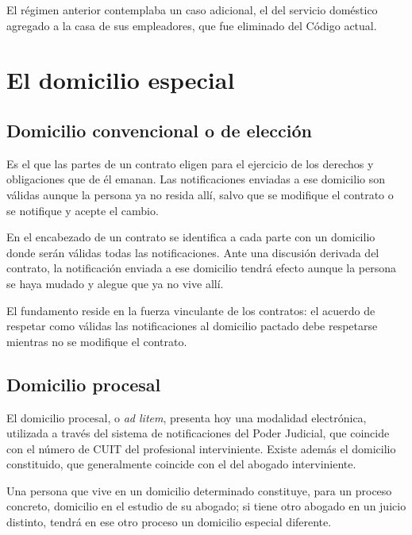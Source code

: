 \documentclass[12pt,oneside]{book}
\begin{document}
El régimen anterior contemplaba un caso adicional, el del servicio doméstico agregado a la casa de sus empleadores, que fue eliminado del Código actual.

\section{El domicilio especial}

\subsection{Domicilio convencional o de elección}

\begin{definicion}
Es el que las partes de un contrato eligen para el ejercicio de los derechos y obligaciones que de él emanan. Las notificaciones enviadas a ese domicilio son válidas aunque la persona ya no resida allí, salvo que se modifique el contrato o se notifique y acepte el cambio.
\end{definicion}

\begin{ejemplo}
En el encabezado de un contrato se identifica a cada parte con un domicilio donde serán válidas todas las notificaciones. Ante una discusión derivada del contrato, la notificación enviada a ese domicilio tendrá efecto aunque la persona se haya mudado y alegue que ya no vive allí.
\end{ejemplo}

El fundamento reside en la fuerza vinculante de los contratos: el acuerdo de respetar como válidas las notificaciones al domicilio pactado debe respetarse mientras no se modifique el contrato.

\subsection{Domicilio procesal}

El domicilio procesal, o \textit{ad litem}, presenta hoy una modalidad electrónica, utilizada a través del sistema de notificaciones del Poder Judicial, que coincide con el número de CUIT del profesional interviniente. Existe además el domicilio constituido, que generalmente coincide con el del abogado interviniente.

\begin{ejemplo}
Una persona que vive en un domicilio determinado constituye, para un proceso concreto, domicilio en el estudio de su abogado; si tiene otro abogado en un juicio distinto, tendrá en ese otro proceso un domicilio especial diferente.
\end{ejemplo}
\end{document}
